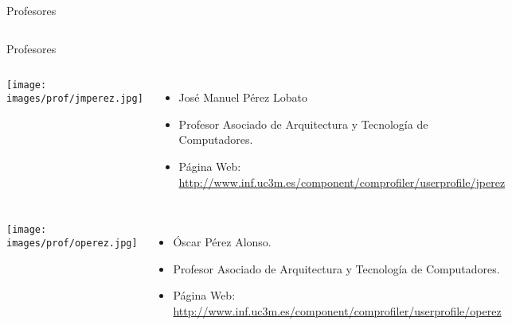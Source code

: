 {\begin{frame}{Profesores}
\begin{columns}
\end{columns}

\end{frame}


\begin{frame}{Profesores}

\begin{columns}

\texttt{[image: images/prof/jmperez.jpg]}

\begin{itemize}
\item José Manuel Pérez Lobato
\item Profesor Asociado de Arquitectura y Tecnología de Computadores.
\item Página Web: \url{http://www.inf.uc3m.es/component/comprofiler/userprofile/jperez}
\end{itemize}

\end{columns}

\vfill

\begin{columns}

\texttt{[image: images/prof/operez.jpg]}

\begin{itemize}
\item Óscar Pérez Alonso.
\item Profesor Asociado de Arquitectura y Tecnología de Computadores.
\item Página Web: \url{http://www.inf.uc3m.es/component/comprofiler/userprofile/operez}
\end{itemize}

\end{columns}

\end{frame}


}
